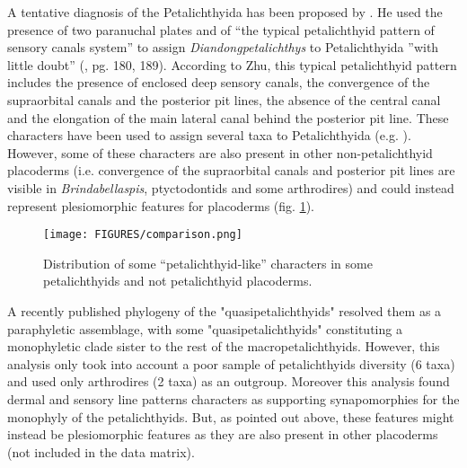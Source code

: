 \documentclass[11pt,letterpaper]{report}
\begin{document}
A tentative diagnosis of the Petalichthyida has been proposed by \cite{Zhu1991}. He used the presence of two paranuchal plates and of “the typical petalichthyid pattern of sensory canals system” to assign \textit{Diandongpetalichthys} to Petalichthyida ''with little doubt'' (\citealt{Zhu1991}, pg. 180, 189). According to Zhu, this typical petalichthyid pattern includes the presence of enclosed deep sensory canals, the convergence of the supraorbital canals and the posterior pit lines, the absence of the central canal and the elongation of the main lateral canal behind the posterior pit line. These characters have been used to assign several taxa to Petalichthyida (e.g. \citealt{p1978devonian,Zhu1991,Zhu1996a}). However, some of these characters are also present in other non-petalichthyid placoderms (i.e. convergence of the supraorbital canals and posterior pit lines are visible in \textit{Brindabellaspis}, ptyctodontids and some arthrodires) and could instead represent plesiomorphic features for placoderms (fig. \ref{petalcompar}). 

\begin{figure}[!h]
\centering
    \texttt{[image: FIGURES/comparison.png]}
\caption{\footnotesize{Distribution of some “petalichthyid-like” characters in some petalichthyids and not petalichthyid placoderms.}}
\label{petalcompar}
\end{figure}

A recently published phylogeny of the "quasipetalichthyids" \citep{pan2015new} resolved them as a paraphyletic assemblage, with some "quasipetalichthyids" constituting a monophyletic clade sister to the rest of the macropetalichthyids. However, this analysis only took into account a poor sample of petalichthyids diversity (6 taxa) and used only arthrodires (2 taxa) as an outgroup. Moreover this analysis found dermal and sensory line patterns characters as supporting synapomorphies for the monophyly of the petalichthyids. But, as pointed out above, these features might instead be plesiomorphic features as they are also present in other placoderms (not included in the data matrix). 
\end{document}

